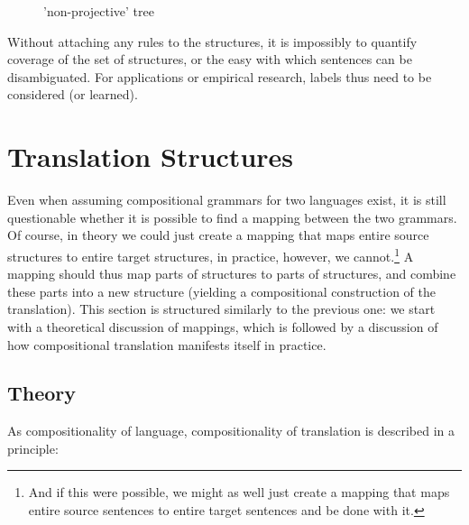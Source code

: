 \documentclass{report}
\theoremstyle{break}
\begin{document}
\begin{figure}[!ht]
\centering
{}
\caption{'non-projective' tree}\label{fig:struct3}
\end{figure}

Without attaching any rules to the structures, it is impossibly to quantify coverage of the set of structures, or the easy with which sentences can be disambiguated. For applications or empirical research, labels thus need to be considered (or learned).

\section{Translation Structures}

Even when assuming compositional grammars for two languages exist, it is still questionable whether it is possible to find a mapping between the two grammars. Of course, in theory we could just create a mapping that maps entire source structures to entire target structures, in practice, however, we cannot.\footnote{And if this were possible, we might as well just create a mapping that maps entire source sentences to entire target sentences and be done with it.} A mapping should thus map parts of structures to parts of structures, and combine these parts into a new structure (yielding a compositional construction of the translation). This section is structured similarly to the previous one: we start with a theoretical discussion of mappings, which is followed by a discussion of how compositional translation manifests itself in practice.
 
\subsection{Theory}

As compositionality of language, compositionality of translation is described in a principle:
\end{document}
